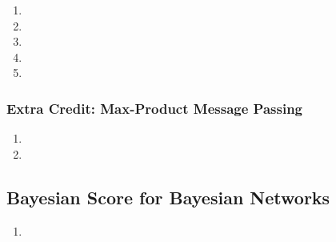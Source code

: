 \documentclass[11pt,a4paper]{article}
\begin{document}
\begin{enumerate}
		
		\item
		\item
		\item
		\item
		\item
	\end{enumerate}
	
	\subsubsection{Extra Credit: Max-Product Message Passing}
	
	\begin{enumerate}
		\item
		\item 
	\end{enumerate}
	
	\subsection{Bayesian Score for Bayesian Networks}
	
	\begin{enumerate}
		\item 
	\end{enumerate}
	
\end{document}
